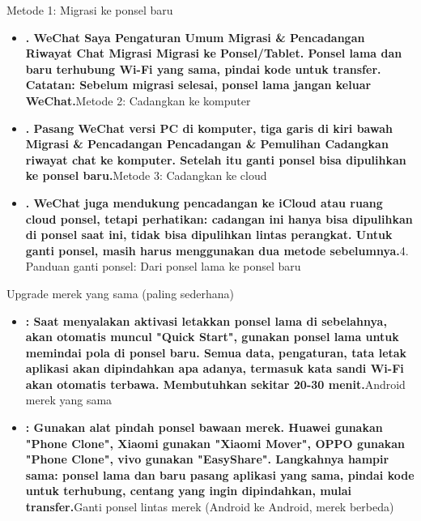 
Metode 1: Migrasi ke ponsel baru

\begin{itemize}
  \item \textbf{. WeChat Saya Pengaturan Umum Migrasi \& Pencadangan Riwayat Chat Migrasi Migrasi ke Ponsel/Tablet. Ponsel lama dan baru terhubung Wi-Fi yang sama, pindai kode untuk transfer. Catatan: Sebelum migrasi selesai, ponsel lama jangan keluar WeChat.}Metode 2: Cadangkan ke komputer
  \item \textbf{. Pasang WeChat versi PC di komputer, tiga garis di kiri bawah Migrasi \& Pencadangan Pencadangan \& Pemulihan Cadangkan riwayat chat ke komputer. Setelah itu ganti ponsel bisa dipulihkan ke ponsel baru.}Metode 3: Cadangkan ke cloud
  \item \textbf{. WeChat juga mendukung pencadangan ke iCloud atau ruang cloud ponsel, tetapi perhatikan: cadangan ini hanya bisa dipulihkan di ponsel saat ini, tidak bisa dipulihkan lintas perangkat. Untuk ganti ponsel, masih harus menggunakan dua metode sebelumnya.}4. Panduan ganti ponsel: Dari ponsel lama ke ponsel baru
\end{itemize}


Upgrade merek yang sama (paling sederhana)


\begin{itemize}
  \item \textbf{: Saat menyalakan aktivasi letakkan ponsel lama di sebelahnya, akan otomatis muncul "Quick Start", gunakan ponsel lama untuk memindai pola di ponsel baru. Semua data, pengaturan, tata letak aplikasi akan dipindahkan apa adanya, termasuk kata sandi Wi-Fi akan otomatis terbawa. Membutuhkan sekitar 20-30 menit.}Android merek yang sama
  \item \textbf{: Gunakan alat pindah ponsel bawaan merek. Huawei gunakan "Phone Clone", Xiaomi gunakan "Xiaomi Mover", OPPO gunakan "Phone Clone", vivo gunakan "EasyShare". Langkahnya hampir sama: ponsel lama dan baru pasang aplikasi yang sama, pindai kode untuk terhubung, centang yang ingin dipindahkan, mulai transfer.}Ganti ponsel lintas merek (Android ke Android, merek berbeda)
\end{itemize}


